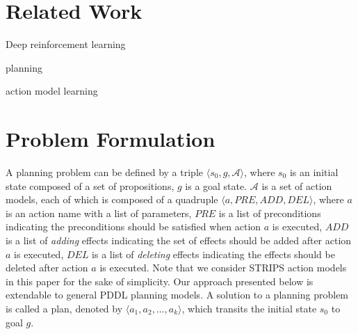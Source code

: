 \documentclass[letterpaper]{article}
\newcommand{\ignore}[1]{{}}
\begin{document}
\section{Related Work}

Deep reinforcement learning

planning

action model learning 


\cite{word2vec}



\ignore{We refer to the above method as one-step Q-learning because it updates the action value $Q(s,a)$ toward the one-step return $r+\gamma\max_{a'}Q(s',a';\theta)$. One drawback of using one-step methods is that obtaining a reward $r$ only directly affects the value of the state action pair $s,a$ that led to the reward. The values of other state action pairs are affected only indirectly through the updated value $Q(s,a)$. This can make the learning process slow since many updates are required the propagate a reward to the relevant preceding states and actions. One way of propagating rewards faster is by using $n$-step returns \cite{}. In $n$-step Q-learning, $Q(s,a)$ is updated toward the $n$-step return defined as $r_t+\gamma r_{t+1}+\cdots+\gamma^{n-1}r_{t+n-1}+\max_a\gamma^nQ(s_{t+n},a)$. This results in single reward $r$ directly affecting the values of $n$ preceding state action pairs. This makes the process of propagating rewards to relevant state-action pairs potentially much more efficient.

In contrast to value-based methods, policy-based model-free methods directly parameterize the policy $\pi(a|s;\theta)$ and update the parameters $\theta$ by performing, typically approximate, gradient ascent on $\mathbb{E}[R_t]$.}

\section{Problem Formulation}
A planning problem can be defined by a triple $\langle s_0,g,\mathcal{A}\rangle$, where $s_0$ is an initial state composed of a set of propositions, $g$ is a goal state. $\mathcal{A}$ is a set of action models, each of which is composed of a quadruple $\langle a, PRE, ADD, DEL\rangle$, where $a$ is an action name with a list of parameters, $PRE$ is a list of preconditions indicating the preconditions should be satisfied when action $a$ is executed, $ADD$ is a list of \emph{adding} effects indicating the set of effects should be added after action $a$ is executed, $DEL$ is a list of \emph{deleting} effects indicating the effects should be deleted after action $a$ is executed. Note that we consider STRIPS action models in this paper for the sake of simplicity. Our approach presented below is extendable to general PDDL planning models. A solution to a planning problem is called a plan, denoted by $\langle a_1,a_2,\ldots,a_k\rangle$, which transits the initial state $s_0$ to goal $g$. 
\end{document}
